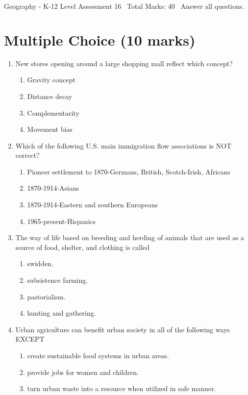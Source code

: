 \documentclass[12pt]{article}
\begin{document}
\begin{center}
Geography - K-12 Level Assessment 16 \
Total Marks: 40 \
Answer all questions.
\end{center}

\section*{Multiple Choice (10 marks)}
\begin{enumerate}[label=\arabic*.]
\item New stores opening around a large shopping mall reflect which concept?
\begin{enumerate}[label=(\alph*)]
    \item Gravity concept
    \item Distance decay
    \item Complementarity
    \item Movement bias
\end{enumerate}
\item Which of the following U.S. main immigration flow associations is NOT correct?
\begin{enumerate}[label=(\alph*)]
    \item Pioneer settlement to 1870-Germans, British, Scotch-Irish, Africans
    \item 1870-1914-Asians
    \item 1870-1914-Eastern and southern Europeans
    \item 1965-present-Hispanics
\end{enumerate}
\item The way of life based on breeding and herding of animals that are used as a source of food, shelter, and clothing is called
\begin{enumerate}[label=(\alph*)]
    \item swidden.
    \item subsistence farming.
    \item pastorialism.
    \item hunting and gathering.
\end{enumerate}
\item Urban agriculture can benefit urban society in all of the following ways EXCEPT
\begin{enumerate}[label=(\alph*)]
    \item create sustainable food systems in urban areas.
    \item provide jobs for women and children.
    \item turn urban waste into a resource when utilized in safe manner.

\end{enumerate}
\end{enumerate}
\end{document}
